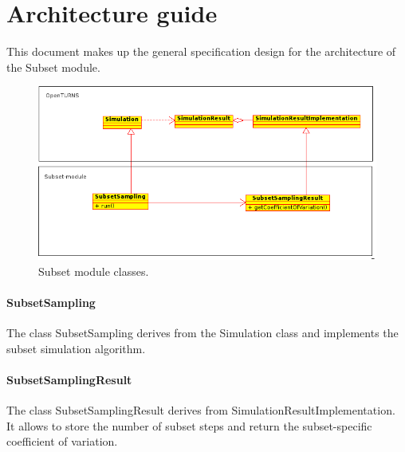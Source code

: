 % 

\section{Architecture guide}

This document makes up the general specification design for the architecture of the Subset module.

\begin{figure}[htb]
  \begin{center}
    \includegraphics[scale=0.8]{architecture.png}
    \caption{Subset module classes.}\label{fig:architecture}
  \end{center}
\end{figure}


\paragraph{SubsetSampling}

The class SubsetSampling derives from the Simulation class and implements the subset simulation algorithm.\\

\paragraph{SubsetSamplingResult}

The class SubsetSamplingResult derives from SimulationResultImplementation.\\
It allows to store the number of subset steps and return the subset-specific coefficient of variation.\\


